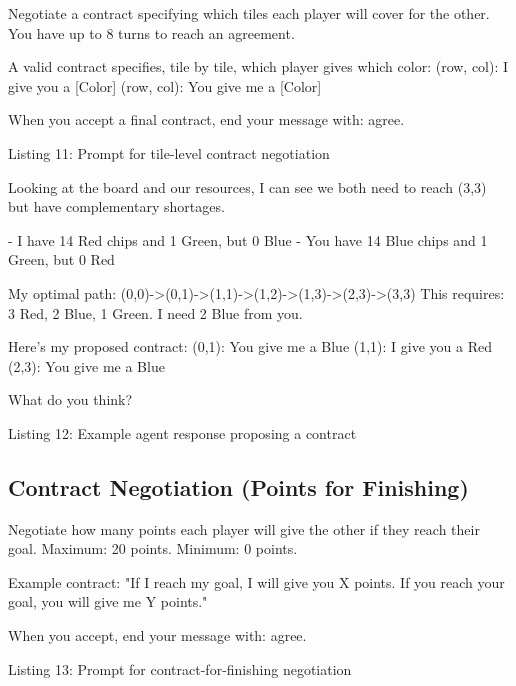 \documentclass{article} %
\begin{document}
\begin{promptbox}

Negotiate a contract specifying which tiles each player will cover for the other. You have up to 8 turns to reach an agreement.

A valid contract specifies, tile by tile, which player gives which color:
(row, col): I give you a [Color]
(row, col): You give me a [Color]

When you accept a final contract, end your message with: agree.
\end{promptbox}
\vspace{-8pt}
\begin{center}\small Listing 11: Prompt for tile-level contract negotiation\end{center}

\begin{promptbox}
Looking at the board and our resources, I can see we both
need to reach (3,3) but have complementary shortages.

- I have 14 Red chips and 1 Green, but 0 Blue
- You have 14 Blue chips and 1 Green, but 0 Red

My optimal path: (0,0)->(0,1)->(1,1)->(1,2)->(1,3)->(2,3)->(3,3)
This requires: 3 Red, 2 Blue, 1 Green. I need 2 Blue from you.

Here's my proposed contract:
(0,1): You give me a Blue
(1,1): I give you a Red
(2,3): You give me a Blue

What do you think?
\end{promptbox}
\vspace{-8pt}
\begin{center}\small Listing 12: Example agent response proposing a contract\end{center}

\subsection{Contract Negotiation (Points for Finishing)}

\begin{promptbox}

Negotiate how many points each player will give the other if they reach their goal. Maximum: 20 points. Minimum: 0 points.

Example contract:
"If I reach my goal, I will give you X points.
If you reach your goal, you will give me Y points."

When you accept, end your message with: agree.
\end{promptbox}
\vspace{-8pt}
\begin{center}\small Listing 13: Prompt for contract-for-finishing negotiation\end{center}
\end{document}
